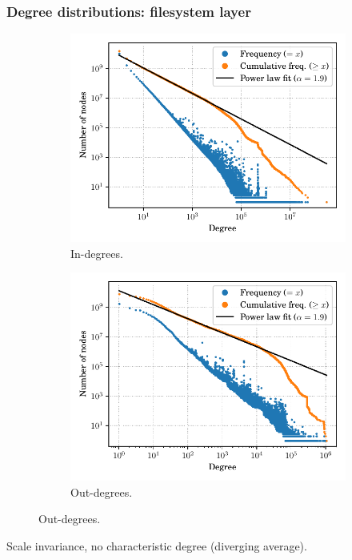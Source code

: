 \documentclass[aspectratio=169,xcolor=table]{beamer}
\begin{document}
    \begin{frame}
        \frametitle{Degree distributions: filesystem layer}
        \begin{figure}
            \begin{subfigure}{.49\textwidth}
                \centering
                \includegraphics[width=\linewidth]{../img/topology/inout/dir+cnt_in}
                \caption{In-degrees.}
            \end{subfigure}\hfill
            \begin{subfigure}{.49\textwidth}
                \centering
                \includegraphics[width=\linewidth]{../img/topology/inout/dir+cnt_out}
                \caption{Out-degrees.}
            \end{subfigure}
        \end{figure}

        \begin{block}{}
            Scale invariance, no characteristic degree (diverging average).
        \end{block}
    \end{frame}
\end{document}
